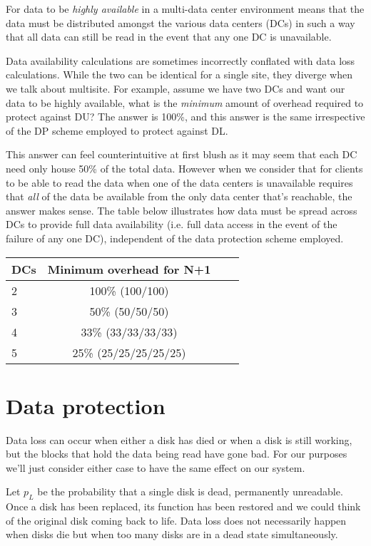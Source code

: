 \documentclass[11pt]{article}
\begin{document}
For data to be \emph{highly available} in a multi-data center environment means that the data must be distributed amongst the various data centers (DCs) in such a way that all data can still be read in the event that any one DC is unavailable. 

Data availability calculations are sometimes incorrectly conflated with data loss calculations. While the two can be identical for a single site, they diverge when we talk about multisite. For example, assume we have two DCs and want our data to be highly available, what is the \emph{minimum} amount of overhead required to protect against DU? The answer is 100\%, and this answer is the same irrespective of the DP scheme employed to protect against DL.

This answer can feel counterintuitive at first blush as it may seem that each DC need only house 50\% of the total data. However when we consider that for clients to be able to read the data when one of the data centers is unavailable requires that \emph{all} of the data be available from the only data center that's reachable, the answer makes sense. The table below illustrates how data must be spread across DCs to provide full data availability (i.e. full data access in the event of the failure of any one DC), independent of the data protection scheme employed. 
 
\begin{tabular}{l*{2}{c}l}
DCs & Minimum overhead for N+1 \\
\hline
2 & 100\% (100/100) \\
3 & 50\% (50/50/50) \\
4 & 33\% (33/33/33/33) \\
5 & 25\% (25/25/25/25/25) \\
\end{tabular}

\section{Data protection}

Data loss can occur when either a disk has died or when a disk is still working, but the blocks that hold the data being read have gone bad. For our purposes we'll just consider either case to have the same effect on our system. 

Let $p_L$ be the probability that a single disk is dead, permanently unreadable. Once a disk has been replaced, its function has been restored and we could think of the original disk coming back to life. Data loss does not necessarily happen when disks die but when too many disks are in a dead state simultaneously.
\end{document}

